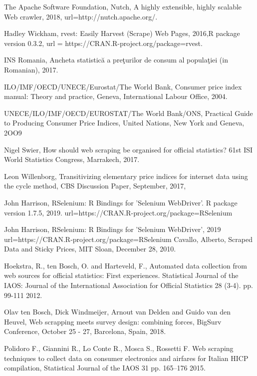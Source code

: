 \documentclass[]{article}
\begin{document}
\begin{thebibliography}{99}
The Apache Software Foundation,
Nutch, A highly extensible, highly scalable Web crawler, 2018,
url={http://nutch.apache.org/}.

Hadley Wickham,
rvest: Easily Harvest (Scrape) Web Pages,
2016,{R package version 0.3.2},
url = {https://CRAN.R-project.org/package=rvest}.


INS Romania, Ancheta statistică a preţurilor de consum al populaţiei (in Romanian),
2017.

ILO/IMF/OECD/UNECE/Eurostat/The World Bank,
Consumer price index manual: Theory and practice,
Geneva, International Labour Office, 2004.

UNECE/ILO/IMF/OECD/EUROSTAT/The World Bank/ONS, 
Practical Guide to Producing Consumer Price Indices, 
United Nations, New York and Geneva, 2OO9


Nigel Swier, 
How should web scraping be organised for official statistics? 
61st ISI World Statistics Congress, Marrakech, 2017.


Leon Willenborg,
Transitivizing elementary price indices for internet data using the cycle method,
CBS Discussion Paper, September, 2017,


John Harrison, 
RSelenium: R Bindings for 'Selenium WebDriver'. R package version 1.7.5, 2019.
url={https://CRAN.R-project.org/package=RSelenium}

John Harrison,
RSelenium: R Bindings for 'Selenium WebDriver', 2019
url={https://CRAN.R-project.org/package=RSelenium}
Cavallo, Alberto, Scraped Data and Sticky Prices, 
MIT Sloan, 
December 28, 2010.


Hoekstra, R., ten Bosch, O. and Harteveld, F., 
Automated data collection from web sources for official statistics: First experiences. 
Statistical Journal of the IAOS: Journal of the International Association for Official Statistics 28 (3-4). pp. 99-111
2012.

Olav ten Bosch, Dick Windmeijer, Arnout van Delden and Guido van den Heuvel,
Web scrapping meets survey design: combining forces,
BigSurv Conference, October 25 - 27, Barcelona, Spain,
2018.

Polidoro F., Giannini R., Lo Conte R., Mosca S., Rossetti F. 
Web scraping techniques to collect data on consumer electronics and airfares for Italian HICP compilation,
Statistical Journal of the IAOS 31 pp. 165–176
2015.


\end{thebibliography}
\end{document}
